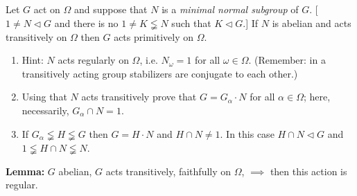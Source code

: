 \documentclass{article}
\begin{document}
\begin{homeworkProblem}
    Let $G$ act on $\Omega$ and suppose that $N$ is a \textit{minimal normal subgroup}
    of $G$. [$1 \neq N \lhd G$ and there is no $1 \neq K \lneqq N$ 
    such that $K \lhd G$.]
    If $N$ is abelian and acts transitively  on $\Omega$ then 
    $G$ acts primitively on $\Omega$.\\
    \begin{enumerate}
        \item Hint: $N$ acts regularly on $\Omega$, i.e. $N_{\omega} = 1$ for all $\omega \in \Omega$.
            (Remember: in a transitively acting group stabilizers are 
            conjugate to each other.)
        \item Using that $N$ acts transitively prove that $G = G_{\alpha} \cdot N$
            for all $\alpha \in \Omega$; here, necessarily, $G_{\alpha} \cap N = 1$.
        \item If $G_{\alpha} \lneqq H \lneqq G$ then $G = H \cdot N$ and
            $H \cap N \neq 1$. In this case $H \cap N \lhd G$
            and $1 \lneqq H \cap N \lneqq N$.
    \end{enumerate}
    \solution

    \textbf{Lemma:} $G$ abelian, $G$ acts transitively, faithfully on $\Omega$,
    $\implies$ then this action is regular.\\


\end{homeworkProblem}
\end{document}
